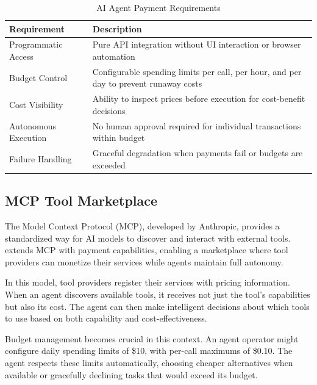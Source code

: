 \begin{table}[htbp]
\centering
\caption{AI Agent Payment Requirements}
\label{tab:agent-requirements}
\begin{tabular}{l p{6.5cm}}
\toprule
\textbf{Requirement} & \textbf{Description} \\
\midrule
Programmatic Access & Pure API integration without UI interaction or browser automation \\
Budget Control & Configurable spending limits per call, per hour, and per day to prevent runaway costs \\
Cost Visibility & Ability to inspect prices before execution for cost-benefit decisions \\
Autonomous Execution & No human approval required for individual transactions within budget \\
Failure Handling & Graceful degradation when payments fail or budgets are exceeded \\
\bottomrule
\end{tabular}
\end{table}

\subsection{MCP Tool Marketplace}

The Model Context Protocol (MCP), developed by Anthropic, provides a standardized way for AI models to discover and interact with external tools. \tprotocol{} extends MCP with payment capabilities, enabling a marketplace where tool providers can monetize their services while agents maintain full autonomy.

In this model, tool providers register their services with pricing information. When an agent discovers available tools, it receives not just the tool's capabilities but also its cost. The agent can then make intelligent decisions about which tools to use based on both capability and cost-effectiveness.

Budget management becomes crucial in this context. An agent operator might configure daily spending limits of \$10, with per-call maximums of \$0.10. The agent respects these limits automatically, choosing cheaper alternatives when available or gracefully declining tasks that would exceed its budget.

